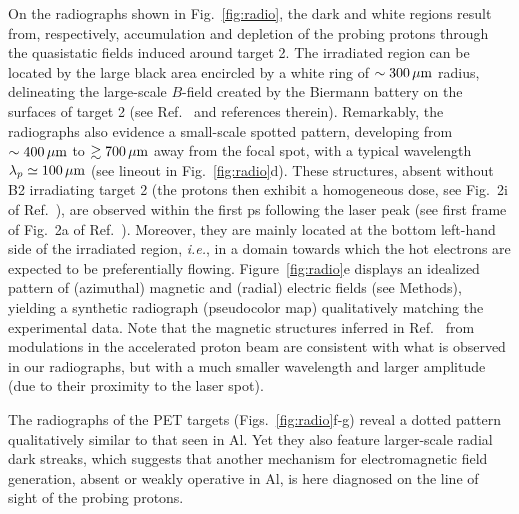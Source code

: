 \documentclass[aps,twocolumn,showpacs,superscriptaddress]{revtex4}
\begin{document}
On the radiographs shown in Fig.~\ref{fig:radio}, the dark and white regions result from, respectively, accumulation and depletion of the probing protons through the quasistatic fields induced around target 2. The irradiated region can be located by the large black area encircled by a white ring of $\sim 300\,\rm \mu m$ radius, delineating the large-scale $B$-field created by the Biermann battery on the surfaces of target 2 (see Ref.~\cite{RSI_Albertazzi_2015} and references therein). 
Remarkably, the radiographs also evidence a small-scale spotted pattern, developing from $\sim 400\,\rm\mu m$ to $\gtrsim 700\,\rm \mu m$ away from the focal spot, with a typical wavelength  $\lambda_p \simeq 100\,\rm \mu m$ (see lineout in Fig.~\ref{fig:radio}d).
These structures, absent without B2 irradiating target 2 (the protons then exhibit a homogeneous dose, see Fig.~2i of Ref.~\cite{RSI_Albertazzi_2015}), are observed within the first ps following the laser peak (see first frame of Fig.~2a of Ref.~\cite{RSI_Albertazzi_2015}). Moreover, they are mainly located at the bottom left-hand side of the irradiated region, \emph{i.e.}, in a domain towards which the hot electrons are expected to be preferentially flowing. Figure~\ref{fig:radio}e displays an idealized pattern of (azimuthal) magnetic and (radial) electric fields (see Methods), yielding a synthetic radiograph (pseudocolor map) qualitatively matching the experimental data. Note that the magnetic structures inferred in Ref.~\cite{PRL_Gode_2017} from modulations in the accelerated proton beam are consistent with what is observed in our radiographs, but with a much smaller wavelength and larger amplitude (due to their proximity to the laser spot).

The radiographs of the PET targets (Figs.~\ref{fig:radio}f-g) reveal a dotted pattern qualitatively similar to that seen in Al. Yet they also feature larger-scale radial dark streaks, which suggests that another mechanism for electromagnetic field generation, absent or weakly operative in Al, is here diagnosed on the line of sight of the probing protons.
\end{document}
